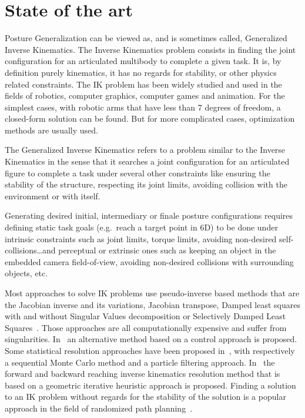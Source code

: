 
\chapter{State of the art}
\label{cha:state_of_the_art}

Posture Generalization can be viewed as, and is sometimes called, Generalized Inverse Kinematics.
The Inverse Kinematics problem consists in finding the joint configuration for an articulated multibody to complete a given task.
It is, by definition purely kinematics, it has no regards for stability, or other physics related constraints.
The IK problem has been widely studied and used in the fields of robotics, computer graphics, computer games and animation.
For the simplest cases, with robotic arms that have less than 7 degrees of freedom, a closed-form solution can be found.
But for more complicated cases, optimization methods are usually used.

The Generalized Inverse Kinematics refers to a problem similar to the Inverse Kinematics in the sense that it searches a joint configuration for an articulated figure to complete a task under several other constraints like ensuring the stability of the structure, respecting its joint limits, avoiding collision with the environment or with itself.

Generating desired initial, intermediary or finale posture configurations requires defining static task goals (e.g.\ reach a target point in 6D) to be done under intrinsic constraints such as joint limits, torque limits, avoiding non-desired self-collisions\ldots and perceptual or extrinsic ones such as keeping an object in the embedded camera field-of-view, avoiding non-desired collisions with surrounding objects, etc.

Most approaches to solve IK problems use pseudo-inverse based methods that are the Jacobian inverse and its variations, Jacobian transpose, Damped least squares with and without Singular Values decomposition or Selectively Damped Least Squares~\cite{balestrino1984robust, tolani2000real, baillieul1985kinematic, wampler1986manipulator, nakamura1986inverse, buss2005selectively}.
Those approaches are all computationally expensive and suffer from singularities.
In~\cite{pechev2008inverse} an alternative method based on a control approach is proposed.
Some statistical resolution approaches have been proposed in~\cite{courty2008inverse, hecker2008real}, with respectively a sequential Monte Carlo method and a particle filtering approach.
In~\cite{AristidouFABRIK, Aristidou:2016_ExtFABRIK} the forward and backward reaching inverse kinematics resolution method that is based on a geometric iterative heuristic approach is proposed.
Finding a solution to an IK problem without regards for the stability of the solution is a popular approach in the field of randomized path planning~\cite{cortes2002random, lavalle1999probabilistic}.

